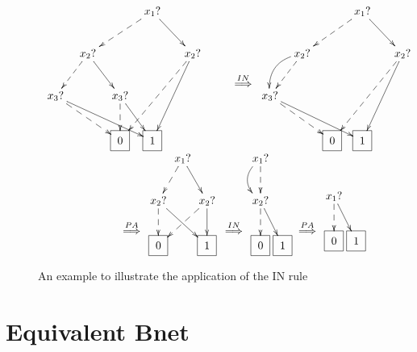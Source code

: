 \begin{figure}[h!]
$$
\begin{array}{c}
\xymatrix@C=.1pc{
&&&&&&x_1?\ar@{-->}[dllll]
\ar[drrr]
\\
&&x_2?\ar@{-->}[dll]\ar[drr]
&&&&&&&x_2?\ar@{-->}[ddlllll]\ar[ddlll]
\\
x_3?\ar[drrrrrr]\ar@{-->}[drrrr]
&&&&x_3?\ar@{-->}[d]\ar[drr]
\\
&&
&&\Rect{0}
&&\Rect{1}
&&
&&
&&
}
\xymatrix{\\\\
\stackrel{IN}{\implies}}
\xymatrix@C=.1pc{
&&&&&&x_1?\ar@{-->}[dllll]
\ar[drrr]
\\
&&x_2?\ar@{-->}[dll]\ar@/_1pc/[dll]
&&&&&&&x_2?\ar@{-->}[ddlllll]\ar[ddlll]
\\
x_3?\ar[drrrrrr]\ar@{-->}[drrrr]
&&&&
\\
&&
&&\Rect{0}
&&\Rect{1}
&&
&&
&&
}
\\
\xymatrix{\\\\\stackrel{PA}{\implies}}
\xymatrix@C=.1pc{
&x_1?\ar@{-->}[dl]\ar[dr]
\\
x_2?\ar@{-->}[d]\ar[drr]
&&x_2?\ar[d]\ar@{-->}[dll]
\\
\Rect{0}
&&\Rect{1}
}
\xymatrix{\\\\\stackrel{IN}{\implies}}
\xymatrix@C=.1pc{x_1?\ar@{-->}[d]\ar@/_1pc/[d]
\\
x_2?\ar@{-->}[d]\ar[dr]
\\
\Rect{0}
&\Rect{1}
}
\xymatrix{\\\\\stackrel{PA}{\implies}}
\xymatrix@C=.1pc{
\\
x_1?\ar@{-->}[d]\ar[dr]
\\
\Rect{0}
&\Rect{1}
}\end{array}
$$
\caption{An example
to illustrate the application of the
IN rule}
\label{fig-example-in-rule}
\end{figure}





\section{Equivalent Bnet}

